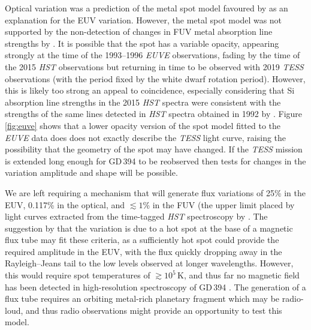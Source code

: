 \documentclass{aastex63}
\begin{document}

Optical variation was a prediction of the metal spot model favoured by \citet{dupuisetal00-1} as an explanation for the EUV variation. However, the metal spot model was not supported by the non-detection of changes in FUV metal absorption line strengths by \citet{wilsonetal19-1}. It is possible that the spot has a variable opacity, appearing strongly at the time of the 1993--1996 \textit{EUVE} observations, fading by the time of the 2015 \textit{HST} observations but returning in time to be observed with 2019 \textit{TESS} observations (with the period fixed by the white dwarf rotation period). However, this is likely too strong an appeal to coincidence, especially considering that Si absorption line strengths in the 2015 \textit{HST} spectra were consistent with the strengths of the same lines detected in \textit{HST} spectra obtained in 1992 by \citet{shipmanetal95-2}. Figure \ref{fig:euve} shows that a lower opacity version of the spot model fitted to the \textit{EUVE} data does does not exactly describe the \textit{TESS} light curve, raising the possibility that the geometry of the spot may have changed. If the \textit{TESS} mission is extended long enough for GD\,394 to be reobserved then tests for changes in the variation amplitude and shape will be possible. 

We are left requiring a mechanism that will generate flux variations of 25\% in the EUV, 0.117\% in the optical, and $\lesssim 1$\% in the FUV (the upper limit placed by light curves extracted from the time-tagged \textit{HST} spectroscopy by \citet{wilsonetal19-1}. The suggestion by \citet{veras+wolszczan19-1} that the variation is due to a hot spot at the base of a magnetic flux tube may fit these criteria, as a sufficiently hot spot could provide the required amplitude in the EUV, with the flux quickly dropping away in the Rayleigh–Jeans tail to the low levels observed at longer wavelengths. However, this would require spot temperatures of $\gtrsim 10^5$\,K, and thus far no  magnetic field has been detected in high-resolution spectroscopy of GD\,394 \citep[$B_e \leq 12$\,kG,][]{dupuisetal00-1, wilsonetal19-1}. The generation of a flux tube requires an orbiting metal-rich planetary fragment which may be radio-loud, and thus radio observations might provide an opportunity to test this model.%
 
\end{document}
